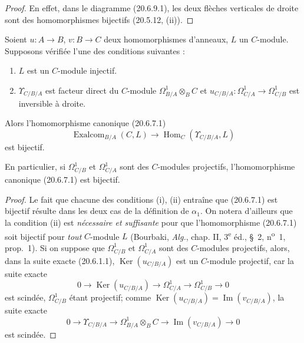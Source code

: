 \begin{proof}
En effet, dans le diagramme (20.6.9.1), les deux flèches verticales de
droite sont des homomorphismes bijectifs (20.5.12, (ii)).
\end{proof}

\begin{theorem}[20.6.11]
\label{0.20.6.11-fr}
Soient $u:A\to B$, $v:B\to C$ deux homomorphismes d'anneaux, $L$ un
$C$-module. Supposons vérifiée l'une des conditions suivantes :
\begin{enumerate}
  \item[\rm(i)] $L$ est un $C$-module injectif.
  \item[\rm(ii)] $\Upsilon_{C/B/A}$ est facteur direct du $C$-module
$\Omega^1_{B/A}\otimes_B C$ et
$u_{C/B/A}:\Omega^1_{C/A}\to\Omega^1_{C/B}$ est inversible à droite.
\end{enumerate}

Alors l'homomorphisme canonique \textup{(20.6.7.1)}
\[
  \operatorname{Exalcom}_{B/A}(C,L)\longrightarrow
  \operatorname{Hom}_C(\Upsilon_{C/B/A},L)
\]
est bijectif.

En particulier, si $\Omega^1_{C/B}$ et $\Omega^1_{C/A}$ sont des
$C$-modules projectifs, l'homomorphisme canonique \textup{(20.6.7.1)} est
bijectif.
\end{theorem}

\begin{proof}
Le fait que chacune des conditions (i), (ii) entraîne que (20.6.7.1) est
bijectif résulte dans les deux cas de la définition de $\alpha_1$. On
notera d'ailleurs que la condition (ii) est \emph{nécessaire et
suffisante} pour que l'homomorphisme (20.6.7.1) soit bijectif pour
\emph{tout} $C$-module $L$ (Bourbaki, \emph{Alg.}, chap. II,
3\textsuperscript{e} éd., \S~2, n\textsuperscript{o}~1, prop.~1). Si on
suppose que $\Omega^1_{C/B}$ et $\Omega^1_{C/A}$ sont des $C$-modules
projectifs, alors, dans la suite exacte (20.6.1.1),
$\operatorname{Ker}(u_{C/B/A})$ est un $C$-module projectif, car la suite exacte
\[
  0\longrightarrow\operatorname{Ker}(u_{C/B/A})\longrightarrow\Omega^1_{C/A}
  \longrightarrow\Omega^1_{C/B}\longrightarrow0
\]
est scindée, $\Omega^1_{C/B}$ étant projectif; comme
$\operatorname{Ker}(u_{C/B/A})=\operatorname{Im}(v_{C/B/A})$, la suite exacte
\[
  0\longrightarrow\Upsilon_{C/B/A}\longrightarrow
  \Omega^1_{B/A}\otimes_B C\longrightarrow
  \operatorname{Im}(v_{C/B/A})\longrightarrow0
\]
est scindée.
\end{proof}

